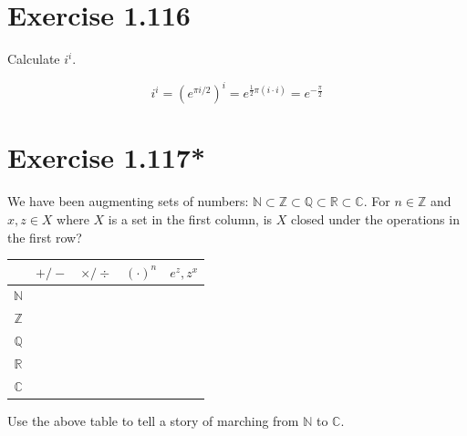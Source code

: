 \documentclass{article}
\begin{document}
\section{Exercise 1.116}
Calculate $i^i$.

\begin{solution}
  \[
    i^i = (e^{\pi i / 2})^{i} = e^{\frac{1}{2} \pi (i \cdot i)} =
    e^{-\frac{\pi}{2}}
  \]
\end{solution}

\section{Exercise 1.117*}
We have been augmenting sets of numbers: $\mathbb{N} \subset
\mathbb{Z} \subset \mathbb{Q} \subset \mathbb{R} \subset \mathbb{C}$.
For $n \in \mathbb{Z}$ and $x, z \in X$ where $X$ is a set in the
first column, is $X$ closed under the operations in the first row?
\begin{center}
  \begin{tabular}{|c|c|c|c|c|}
    \hline
    & $+/-$ & $\times/\div$ & $(\cdot)^n$ & $e^z, z^x$ \\ \hline
    $\mathbb{N}$ & & & & \\ \hline
    $\mathbb{Z}$ & & & & \\ \hline
    $\mathbb{Q}$ & & & & \\ \hline
    $\mathbb{R}$ & & & & \\ \hline
    $\mathbb{C}$ & & & & \\ \hline
  \end{tabular}
\end{center}
Use the above table to tell a story of marching from $\mathbb{N}$ to
$\mathbb{C}$.
\end{document}

